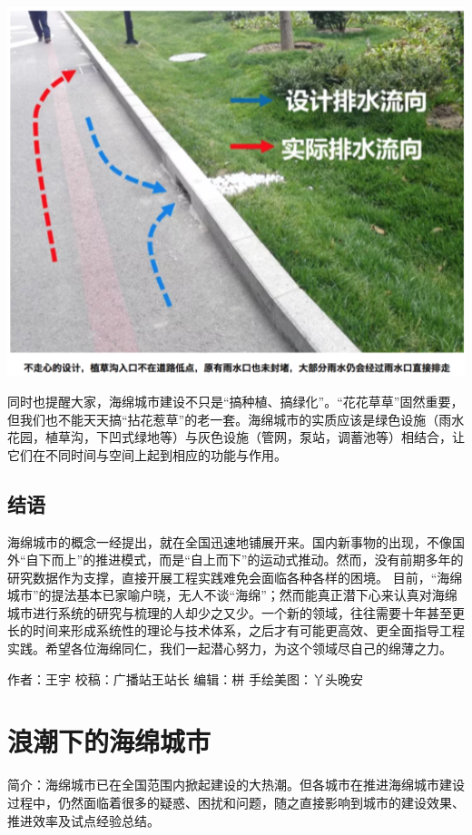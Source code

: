 \documentclass[]{book}
\begin{document}
\includegraphics[width=6.67in]{images/ch7}

同时也提醒大家，海绵城市建设不只是``搞种植、搞绿化''。``花花草草''固然重要，但我们也不能天天搞``拈花惹草''的老一套。海绵城市的实质应该是绿色设施（雨水花园，植草沟，下凹式绿地等）与灰色设施（管网，泵站，调蓄池等）相结合，让它们在不同时间与空间上起到相应的功能与作用。

\subsection{结语}\label{-5}

海绵城市的概念一经提出，就在全国迅速地铺展开来。国内新事物的出现，不像国外``自下而上''的推进模式，而是``自上而下''的运动式推动。然而，没有前期多年的研究数据作为支撑，直接开展工程实践难免会面临各种各样的困境。
目前，``海绵城市''的提法基本已家喻户晓，无人不谈``海绵''；然而能真正潜下心来认真对海绵城市进行系统的研究与梳理的人却少之又少。一个新的领域，往往需要十年甚至更长的时间来形成系统性的理论与技术体系，之后才有可能更高效、更全面指导工程实践。希望各位海绵同仁，我们一起潜心努力，为这个领域尽自己的绵薄之力。

作者：王宇 校稿：广播站王站长 编辑：栟 手绘美图：丫头晚安

\section{浪潮下的海绵城市}

简介：海绵城市已在全国范围内掀起建设的大热潮。但各城市在推进海绵城市建设过程中，仍然面临着很多的疑惑、困扰和问题，随之直接影响到城市的建设效果、推进效率及试点经验总结。
\end{document}
